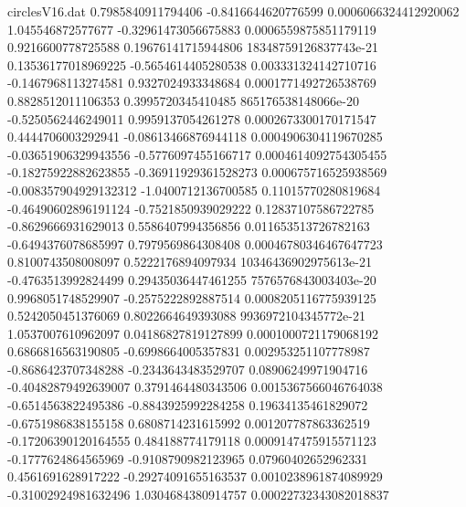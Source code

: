 \begin{filecontents}{circlesV16.dat}
0.7985840911794406	-0.8416644620776599	0.0006066324412920062
1.045546872577677	-0.32961473056675883	0.0006559875851179119
0.9216600778725588	0.19676141715944806	18348759126837743e-21
0.13536177018969225	-0.5654614405280538	0.003331324142710716
-0.1467968113274581	0.9327024933348684	0.0001771492726538769
0.8828512011106353	0.3995720345410485	865176538148066e-20
-0.5250562446249011	0.9959137054261278	0.0002673300170171547
0.4444706003292941	-0.08613466876944118	0.0004906304119670285
-0.03651906329943556	-0.5776097455166717	0.0004614092754305455
-0.18275922882623855	-0.36911929361528273	0.000675716525938569
-0.008357904929132312	-1.0400712136700585	0.11015770280819684
-0.46490602896191124	-0.7521850939029222	0.12837107586722785
-0.8629666931629013	0.5586407994356856	0.011653513726782163
-0.6494376078685997	0.7979569864308408	0.00046780346467647723
0.8100743508008097	0.5222176894097934	10346436902975613e-21
-0.4763513992824499	0.29435036447461255	7576576843003403e-20
0.9968051748529907	-0.2575222892887514	0.0008205116775939125
0.5242050451376069	0.8022664649393088	9936972104345772e-21
1.0537007610962097	0.04186827819127899	0.0001000721179068192
0.6866816563190805	-0.6998664005357831	0.002953251107778987
-0.8686423707348288	-0.2343643483529707	0.08906249971904716
-0.40482879492639007	0.3791464480343506	0.0015367566046764038
-0.6514563822495386	-0.8843925992284258	0.19634135461829072
-0.6751986838155158	0.6808714231615992	0.001207787863362519
-0.17206390120164555	0.484188774179118	0.0009147475915571123
-0.1777624864565969	-0.9108790982123965	0.07960402652962331
0.4561691628917222	-0.29274091655163537	0.0010238961874089929
-0.31002924981632496	1.0304684380914757	0.00022732343082018837
\end{filecontents}
